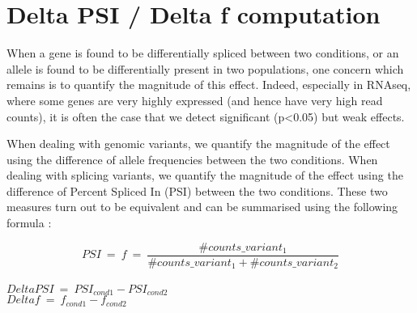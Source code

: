 \documentclass[english, a4paper, 12pt]{article}
\begin{document}
\section{Delta PSI / Delta f computation}
When a gene is found to be differentially spliced between two conditions, or an allele is found to be differentially present in two populations, one concern which remains is to quantify the magnitude of this effect.
Indeed, especially in RNAseq, where some genes are very highly expressed (and hence have very high read counts), it is often the case that we detect significant (p<0.05) but weak effects. 

When dealing with genomic variants, we quantify the magnitude of the effect using the difference of allele frequencies between the two conditions.
When dealing with splicing variants, we quantify the magnitude of the effect using the difference of Percent Spliced In (PSI) between the two conditions.
These two measures turn out to be equivalent and can be summarised using the following formula :

$$PSI \:=\: f  \:=\:  \frac{\#counts\_variant_1}{\#counts\_variant_1 + \#counts\_variant_2} $$ \\
$DeltaPSI \:=\: PSI_{cond1} - PSI_{cond2}$ \\
$Deltaf \:=\: f_{cond1} - f_{cond2}$

\end{document}
